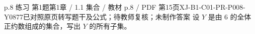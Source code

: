 \par\noindent\begin{minipage}{\linewidth}
\begin{bankitem}{p.8 练习 第1题}{第1章 / 1.1 集合 / 教材 p.8 / PDF 第15页}{XJ-B1-C01-PR-P008-Y0877}{已对照原页转写题干及公式；待教师复核；未制作答案}
设 $Y$ 是由 6 的全体正约数组成的集合，写出 $Y$ 的所有子集。
\end{bankitem}
\end{minipage}\par\medskip

